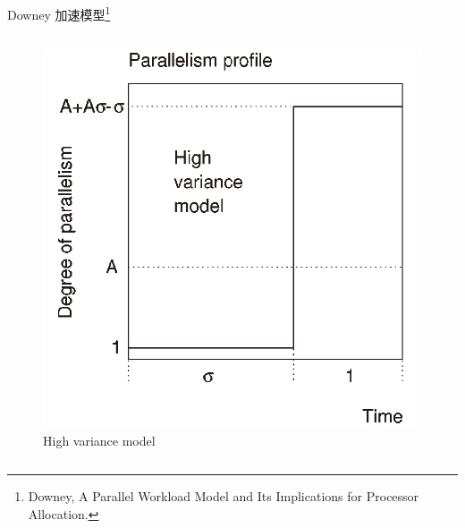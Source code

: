 \begin{frame}{Downey 加速模型\footnote{Downey, A Parallel Workload Model and Its Implications for Processor Allocation.}}
\begin{columns}
        \begin{figure}
            \centering
            \includegraphics[scale=0.15]{pics/high_variance_model.png}
            \caption{High variance model}
        \end{figure}

    \end{columns}

\end{frame}

